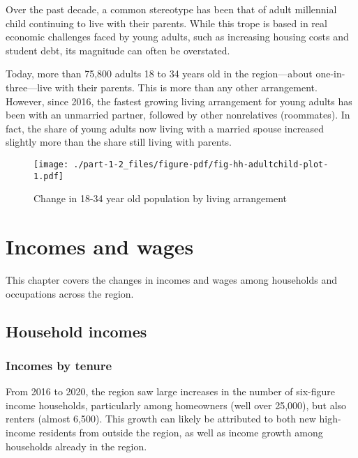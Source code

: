 \documentclass[
  letterpaper,
  DIV=11,
  numbers=noendperiod]{scrreprt}
\begin{document}
Over the past decade, a common stereotype has been that of adult
millennial child continuing to live with their parents. While this trope
is based in real economic challenges faced by young adults, such as
increasing housing costs and student debt, its magnitude can often be
overstated.

Today, more than 75,800 adults 18 to 34 years old in the region---about
one-in-three---live with their parents. This is more than any other
arrangement. However, since 2016, the fastest growing living arrangement
for young adults has been with an unmarried partner, followed by other
nonrelatives (roommates). In fact, the share of young adults now living
with a married spouse increased slightly more than the share still
living with parents.

\begin{figure}

{\centering \texttt{[image: ./part-1-2\_files/figure-pdf/fig-hh-adultchild-plot-1.pdf]}

}

\caption{\label{fig-hh-adultchild-plot}Change in 18-34 year old
population by living arrangement}

\end{figure}

\hypertarget{part-1-3}{%
\chapter{Incomes and wages}\label{part-1-3}}

This chapter covers the changes in incomes and wages among households
and occupations across the region.

\hypertarget{household-incomes}{%
\section{Household incomes}\label{household-incomes}}

\hypertarget{incomes-by-tenure}{%
\subsection{Incomes by tenure}\label{incomes-by-tenure}}

From 2016 to 2020, the region saw large increases in the number of
six-figure income households, particularly among homeowners (well over
25,000), but also renters (almost 6,500). This growth can likely be
attributed to both new high-income residents from outside the region, as
well as income growth among households already in the region.
\end{document}
